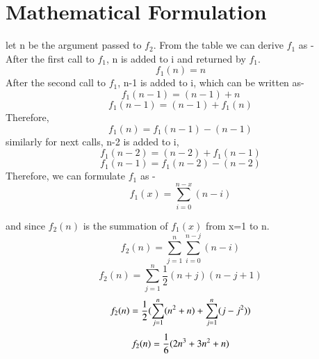 \documentclass[journal,12pt,twocolumn]{IEEEtran}
\begin{document}
\section{Mathematical Formulation}
let n be the argument passed to \begin{math}f_2\end{math}.
From the table we can derive $f_1$ as - \\
After the first call to \begin{math}f_1\end{math}, n is added to i and returned by \begin{math}f_1\end{math}.
\begin{equation}
f_1(n) = n 
\end{equation}
After the second call to \begin{math}f_1\end{math}, n-1 is added to i, which can be written as-
\begin{equation}
f_1(n-1) = (n-1) + n 
\end{equation}
\begin{equation}
f_1(n-1)= (n-1) + f_1(n) 
\end{equation}
Therefore,
\begin{equation}
f_1(n) = f_1(n-1) - (n-1) 
\end{equation}
similarly for next calls, n-2 is added to i,
\begin{equation}
f_1(n-2) = (n-2) + f_1(n-1) 
\end{equation}
\begin{equation}
f_1(n-1) = f_1(n-2) - (n-2)
\end{equation}
Therefore, we can formulate \begin{math}f_1\end{math} as -
\begin{equation}
f_1(x) = \sum_{i=0}^{n-x} (n-i)
\end{equation}

and since $f_2(n)$ is the summation of $f_1(x)$ from x=1 to n.\\
\begin{equation}
f_2(n) = \sum_{j=1}^{n} \sum_{i=0}^{n-j} (n-i)
\end{equation}
\begin{equation}
f_2(n) = \sum_{j=1}^{n} \frac{1}{2}(n+j)(n-j+1)
\end{equation}
\begin{equation}
f_2(n) = \frac{1}{2} (\sum_{j=1}^{n} (n\textsuperscript{2} + n) + \sum_{j=1}^{n} (j - j\textsuperscript{2}) )
\end{equation}
\begin{equation}
f_2(n) = \frac{1}{6} (2n\textsuperscript{3} + 3n\textsuperscript{2} + n)
\end{equation}
\end{document}
